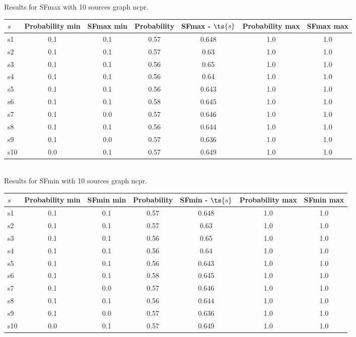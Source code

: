 \documentclass{article}
\begin{document}
\noindent Results for SFmax with 10 sources graph ncpr.

\noindent\begin{tabular}{|l|c|c|c|c|c|c|}
\hline
$s$& Probability min & SFmax min & Probability & SFmax - $\ts{s}$ & Probability max & SFmax max\\
\hline
s1 &0.1 & 0.1 & 0.57 & 0.648 & 1.0 & 1.0\\
\hline
s2 &0.1 & 0.1 & 0.57 & 0.63 & 1.0 & 1.0\\
\hline
s3 &0.1 & 0.1 & 0.56 & 0.65 & 1.0 & 1.0\\
\hline
s4 &0.1 & 0.1 & 0.56 & 0.64 & 1.0 & 1.0\\
\hline
s5 &0.1 & 0.1 & 0.56 & 0.643 & 1.0 & 1.0\\
\hline
s6 &0.1 & 0.1 & 0.58 & 0.645 & 1.0 & 1.0\\
\hline
s7 &0.1 & 0.0 & 0.57 & 0.646 & 1.0 & 1.0\\
\hline
s8 &0.1 & 0.1 & 0.56 & 0.644 & 1.0 & 1.0\\
\hline
s9 &0.1 & 0.0 & 0.57 & 0.636 & 1.0 & 1.0\\
\hline
s10 &0.0 & 0.1 & 0.57 & 0.649 & 1.0 & 1.0\\
\hline
\end{tabular}\\

\noindent Results for SFmin with 10 sources graph ncpr.

\noindent\begin{tabular}{|l|c|c|c|c|c|c|}
\hline
$s$& Probability min & SFmin min & Probability & SFmin - $\ts{s}$ & Probability max & SFmin max\\
\hline
s1 &0.1 & 0.1 & 0.57 & 0.648 & 1.0 & 1.0\\
\hline
s2 &0.1 & 0.1 & 0.57 & 0.63 & 1.0 & 1.0\\
\hline
s3 &0.1 & 0.1 & 0.56 & 0.65 & 1.0 & 1.0\\
\hline
s4 &0.1 & 0.1 & 0.56 & 0.64 & 1.0 & 1.0\\
\hline
s5 &0.1 & 0.1 & 0.56 & 0.643 & 1.0 & 1.0\\
\hline
s6 &0.1 & 0.1 & 0.58 & 0.645 & 1.0 & 1.0\\
\hline
s7 &0.1 & 0.0 & 0.57 & 0.646 & 1.0 & 1.0\\
\hline
s8 &0.1 & 0.1 & 0.56 & 0.644 & 1.0 & 1.0\\
\hline
s9 &0.1 & 0.0 & 0.57 & 0.636 & 1.0 & 1.0\\
\hline
s10 &0.0 & 0.1 & 0.57 & 0.649 & 1.0 & 1.0\\
\hline
\end{tabular}\\
\end{document}

